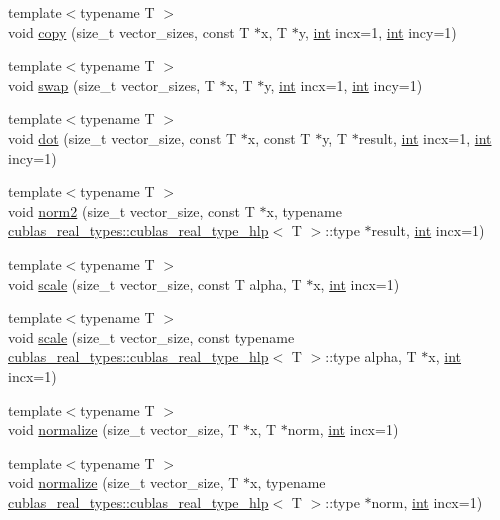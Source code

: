 \begin{DoxyCompactItemize}
\item 
{\footnotesize template$<$typename T $>$ }\\void \hyperlink{classcublas__wrap_ab82bf27dc11f1bcd2ab4f4093595dfda}{copy} (size\-\_\-t vector\-\_\-sizes, const T $\ast$x, T $\ast$y, \hyperlink{classint}{int} incx=1, \hyperlink{classint}{int} incy=1)
\item 
{\footnotesize template$<$typename T $>$ }\\void \hyperlink{classcublas__wrap_a247fc6b5ddd0a8a2026d8e8c67e2990b}{swap} (size\-\_\-t vector\-\_\-sizes, T $\ast$x, T $\ast$y, \hyperlink{classint}{int} incx=1, \hyperlink{classint}{int} incy=1)
\item 
{\footnotesize template$<$typename T $>$ }\\void \hyperlink{classcublas__wrap_afee6a53267fd93c91988744f930d3ec3}{dot} (size\-\_\-t vector\-\_\-size, const T $\ast$x, const T $\ast$y, T $\ast$result, \hyperlink{classint}{int} incx=1, \hyperlink{classint}{int} incy=1)
\item 
{\footnotesize template$<$typename T $>$ }\\void \hyperlink{classcublas__wrap_a810186a2de795b165d32da3145338584}{norm2} (size\-\_\-t vector\-\_\-size, const T $\ast$x, typename \hyperlink{structcublas__real__types_1_1cublas__real__type__hlp}{cublas\-\_\-real\-\_\-types\-::cublas\-\_\-real\-\_\-type\-\_\-hlp}$<$ T $>$\-::type $\ast$result, \hyperlink{classint}{int} incx=1)
\item 
{\footnotesize template$<$typename T $>$ }\\void \hyperlink{classcublas__wrap_af58e99250b1611fab4bf89b98a7925af}{scale} (size\-\_\-t vector\-\_\-size, const T alpha, T $\ast$x, \hyperlink{classint}{int} incx=1)
\item 
{\footnotesize template$<$typename T $>$ }\\void \hyperlink{classcublas__wrap_a334b4d6ffee20ee09a1fd91cf118b2c0}{scale} (size\-\_\-t vector\-\_\-size, const typename \hyperlink{structcublas__real__types_1_1cublas__real__type__hlp}{cublas\-\_\-real\-\_\-types\-::cublas\-\_\-real\-\_\-type\-\_\-hlp}$<$ T $>$\-::type alpha, T $\ast$x, \hyperlink{classint}{int} incx=1)
\item 
{\footnotesize template$<$typename T $>$ }\\void \hyperlink{classcublas__wrap_a6d4d2cd327b9c455e372046ea6a50e9d}{normalize} (size\-\_\-t vector\-\_\-size, T $\ast$x, T $\ast$norm, \hyperlink{classint}{int} incx=1)
\item 
{\footnotesize template$<$typename T $>$ }\\void \hyperlink{classcublas__wrap_a923aa32d33540e473c78b5cef73e7c5d}{normalize} (size\-\_\-t vector\-\_\-size, T $\ast$x, typename \hyperlink{structcublas__real__types_1_1cublas__real__type__hlp}{cublas\-\_\-real\-\_\-types\-::cublas\-\_\-real\-\_\-type\-\_\-hlp}$<$ T $>$\-::type $\ast$norm, \hyperlink{classint}{int} incx=1)

\end{DoxyCompactItemize}
